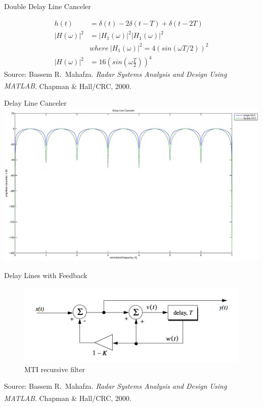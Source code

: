 \documentclass[mathserif]{beamer}
\begin{document}
    
    \begin{frame}{Double Delay Line Canceler}
      \begin{minipage}[t][0.8\textheight][t]{\textwidth}
	\begin{align}
	  h(t) & = \delta(t) - 2\delta(t-T) + \delta(t-2T) \nonumber \\
	  |H(\omega)|^2 & = |H_1(\omega)|^2|H_1(\omega)|^2 \nonumber \\
	  & where~ |H_1(\omega)|^2 = 4(sin(\omega T/2))^2 \nonumber \\
	  |H(\omega)|^2 & = 16\left(sin\left(\omega\frac{T}{2}\right)\right)^4 \nonumber
	\end{align}
	\vfill
    	\tiny{Source: Bassem R.~Mahafza. \emph{Radar Systems Analysis and Design Using MATLAB\textsuperscript{\textregistered}}. Chapman \& Hall/CRC, 2000.}
      \end{minipage}
    \end{frame}



    \begin{frame}{Delay Line Canceler}
    	\includegraphics[width=\linewidth]{delayLineCanceler}
    \end{frame}
    
    
    
    \begin{frame}{Delay Lines with Feedback}
      \begin{minipage}[t][0.8\textheight][t]{\textwidth}
	\begin{figure}[h]
		\centering
		\includegraphics[width=\linewidth]{feedbackDLC} 
		\caption{MTI recursive filter}
	\end{figure}
	\vfill
    	\tiny{Source: Bassem R.~Mahafza. \emph{Radar Systems Analysis and Design Using MATLAB\textsuperscript{\textregistered}}. Chapman \& Hall/CRC, 2000.}
      \end{minipage}
    \end{frame}
    
\end{document}
